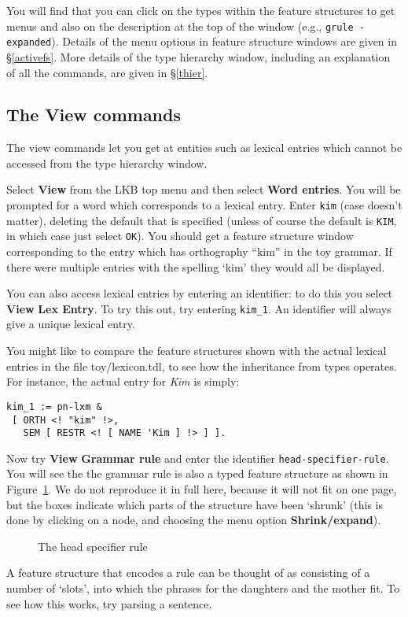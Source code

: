 \documentclass[12pt]{report}
\begin{document}
You will find that
you can click on the types within the feature structures to get menus
and also on the description at the top of the window
(e.g., {\tt grule - expanded}).
Details of the menu options in feature structure windows 
are given in \S\ref{activefs}.
More details of the type hierarchy window, including an explanation of all the
commands,
are given in \S\ref{thier}.

\subsection{The View commands}

The view commands let you get at entities such as lexical entries which cannot
be accessed from the type hierarchy window.

Select {\bf View} from the LKB top menu and then select {\bf Word entries}.
You will be prompted for a word which corresponds to a lexical entry.
Enter {\tt kim} (case doesn't matter), deleting the default that
is specified (unless of course the default is {\tt KIM}, in which
case just select {\tt OK}).
You should get a feature structure window corresponding to the entry 
which has orthography ``kim'' in the toy grammar.
If there were multiple entries with the spelling `kim' they would all
be displayed. 

You can also access lexical entries by entering an identifier: to
do this you select {\bf View} {\bf Lex Entry}.  
To try this out, try entering {\tt kim\_1}.
An identifier will always
give a unique lexical entry.  

You might like 
to compare the feature structures shown with the actual lexical
entries in the file toy/lexicon.tdl, to see how the inheritance from types
operates.  For instance, the actual entry for {\it Kim} is
simply:
\begin{verbatim}
kim_1 := pn-lxm & 
 [ ORTH <! "kim" !>,
   SEM [ RESTR <! [ NAME 'Kim ] !> ] ].
\end{verbatim}

Now try {\bf View} {\bf Grammar rule} and enter the identifier
{\tt head-specifier-rule}.  You will see the the grammar rule
is also a typed feature structure as shown in Figure~\ref{rulefs}.
We do not reproduce it in full here, because
it will not fit on one page, but the boxes indicate which parts of the
structure have been `shrunk' (this is done by clicking on a node,
and choosing the menu option {\bf Shrink/expand}).
\begin{figure}
\epsfxsize=4in
\caption{The head specifier rule}
\label{rulefs}
\end{figure}
A feature structure that encodes a rule can be thought of
as consisting of a number of `slots', into which the phrases for
the daughters and the mother fit.  To see how this works,
try parsing a sentence.
\end{document}
